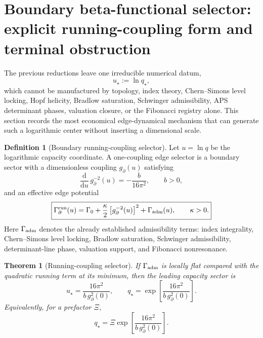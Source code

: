 \documentclass[aps,prd,reprint,nofootinbib,superscriptaddress,floatfix]{revtex4-2}
\numberwithin{equation}{section}
\theoremstyle{definition}
\newtheorem{definition}{Definition}[section]
\theoremstyle{plain}
\newtheorem{theorem}{Theorem}[section]
\newcommand{\dd}{\mathrm d}
\begin{document}
\section{Boundary beta-functional selector: explicit running-coupling form and terminal obstruction}

The previous reductions leave one irreducible numerical datum,
\begin{equation}
u_\star:=\ln q_\star,
\end{equation}
which cannot be manufactured by topology, index theory, Chern--Simons level
locking, Hopf helicity, Bradlow saturation, Schwinger admissibility, APS
determinant phases, valuation closure, or the Fibonacci registry alone.
This section records the most economical edge-dynamical mechanism that can
generate such a logarithmic center without inserting a dimensional scale.

\begin{definition}[Boundary running-coupling selector]
Let \(u=\ln q\) be the logarithmic capacity coordinate.  A one-coupling
edge selector is a boundary sector with a dimensionless coupling
\(g_\partial(u)\) satisfying
\begin{equation}
\frac{\dd}{\dd u}\,g_\partial^{-2}(u)
=
-\frac{b}{16\pi^2},
\qquad b>0,
\end{equation}
and an effective edge potential
\begin{equation}
\boxed{
\Gamma_{\partial}^{\rm run}(u)
=
\Gamma_0+
\frac{\kappa}{2}
\left[g_\partial^{-2}(u)\right]^2
+
\Gamma_{\rm adm}(u),
\qquad
\kappa>0 .
}
\end{equation}
Here \(\Gamma_{\rm adm}\) denotes the already established admissibility
terms: index integrality, Chern--Simons level locking, Bradlow saturation,
Schwinger admissibility, determinant-line phase, valuation support, and
Fibonacci nonresonance.
\end{definition}

\begin{theorem}[Running-coupling selector]
If \(\Gamma_{\rm adm}\) is locally flat compared with the quadratic
running term at its minimum, then the leading capacity sector is
\begin{equation}
\boxed{
u_\star
=
\frac{16\pi^2}{b\,g_\partial^2(0)} ,
\qquad
q_\star=\exp\!\left[\frac{16\pi^2}{b\,g_\partial^2(0)}\right].
}
\end{equation}
Equivalently, for a prefactor \(\Xi\),
\begin{equation}
\boxed{
q_\star=\Xi\exp\!\left[\frac{16\pi^2}{b\,g_\partial^2(0)}\right].
}
\end{equation}
\end{theorem}
\end{document}
